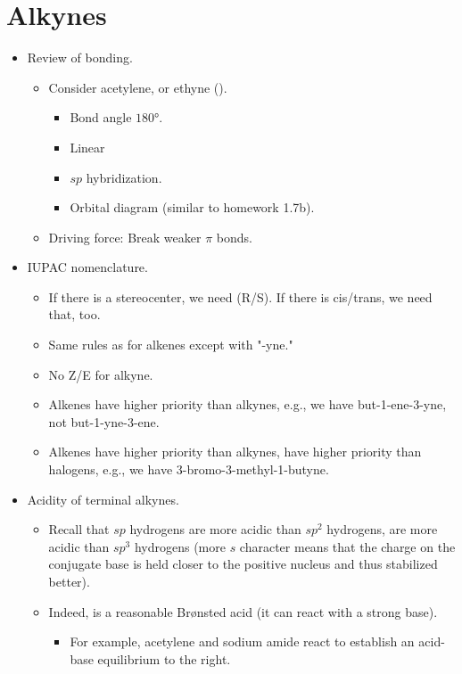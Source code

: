 \documentclass[../notes.tex]{subfiles}
\begin{document}
\section{Alkynes}
\begin{itemize}
    \item Review of bonding.
    \begin{itemize}
        \item Consider acetylene, or ethyne ().
        \begin{itemize}
            \item Bond angle $\ang{180}$.
            \item Linear
            \item $sp$ hybridization.
            \item Orbital diagram (similar to homework 1.7b).
        \end{itemize}
        \item Driving force: Break weaker $\pi$ bonds.
    \end{itemize}
    \item IUPAC nomenclature.
    \begin{itemize}
        \item If there is a stereocenter, we need (R/S). If there is cis/trans, we need that, too.
        \item Same rules as for alkenes except with "-yne."
        \item No Z/E for alkyne.
        \item Alkenes have higher priority than alkynes, e.g., we have but-1-ene-3-yne, not but-1-yne-3-ene.
        \item Alkenes have higher priority than alkynes, have higher priority than halogens, e.g., we have 3-bromo-3-methyl-1-butyne.
    \end{itemize}
    \item Acidity of terminal alkynes.
    \begin{itemize}
        \item Recall that $sp$ hydrogens are more acidic than $sp^2$ hydrogens, are more acidic than $sp^3$ hydrogens (more $s$ character means that the charge on the conjugate base is held closer to the positive nucleus and thus stabilized better).
        \item Indeed,  is a reasonable Br\o nsted acid (it can react with a strong base).
        \begin{itemize}
            \item For example, acetylene and sodium amide react to establish an acid-base equilibrium to the right.

\end{itemize}
\end{itemize}
\end{itemize}
\end{document}
